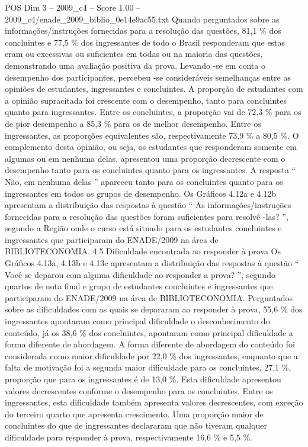\begin{textsample}{POS Dim 3 – 2009\_c4 – Score 1.00 – 2009\_c4/enade\_2009\_biblio\_0e14e9ac55.txt}
Quando perguntados sobre as informações/instruções fornecidas para a resolução das questões, 81,1 \% dos concluintes e 77,5 \% dos ingressantes de todo o Brasil responderam que estas eram ou excessivas ou suficientes em todas ou na maioria das questões, demonstrando uma avaliação positiva da prova.
Levando -se em conta o desempenho dos participantes, percebeu -se consideráveis semelhanças entre as opiniões de estudantes, ingressantes e concluintes.
A proporção de estudantes com a opinião supracitada foi crescente com o desempenho, tanto para concluintes quanto para ingressantes.
Entre os concluintes, a proporção vai de 72,3 \% para os de pior desempenho a 85,3 \% para os de melhor desempenho.
Entre os ingressantes, as proporções equivalentes são, respectivamente 73,9 \% a 80,5 \%.
O complemento desta opinião, ou seja, os estudantes que responderam somente em algumas ou em nenhuma delas, apresentou uma proporção decrescente com o desempenho tanto para os concluintes quanto para os ingressantes.
A resposta “ Não, em nenhuma delas ” apareceu tanto para os concluintes quanto para os ingressantes em todos os grupos de desempenho.
Os Gráficos 4.12a e 4.12b apresentam a distribuição das respostas à questão “ As informações/instruções fornecidas para a resolução das questões foram suficientes para resolvê -las? ”, segundo a Região onde o curso está situado para os estudantes concluintes e ingressantes que participaram do ENADE/2009 na área de BIBLIOTECONOMIA. 4.5 Dificuldade encontrada ao responder à prova Os Gráficos 4.13a, 4.13b e 4.13c apresentam a distribuição das respostas à questão “ Você se deparou com alguma dificuldade ao responder a prova? ”, segundo quartos de nota final e grupo de estudantes concluintes e ingressantes que participaram do ENADE/2009 na área de BIBLIOTECONOMIA.
Perguntados sobre as dificuldades com as quais se depararam ao responder à prova, 55,6 \% dos ingressantes apontaram como principal dificuldade o desconhecimento do conteúdo, já os 38,6 \% dos concluintes, apontaram como principal dificuldade a forma diferente de abordagem.
A forma diferente de abordagem do conteúdo foi considerada como maior dificuldade por 22,0 \% dos ingressantes, enquanto que a falta de motivação foi a segunda maior dificuldade para os concluintes, 27,1 \%, proporção que para os ingressantes é de 13,0 \%.
Esta dificuldade apresentou valores decrescentes conforme o desempenho para os concluintes.
Entre os ingressantes, esta dificuldade também apresenta valores decrescentes, com exceção do terceiro quarto que apresenta crescimento.
Uma proporção maior de concluintes do que de ingressantes declararam que não tiveram qualquer dificuldade para responder à prova, respectivamente 16,6 \% e 5,5 \%.

\end{textsample}
